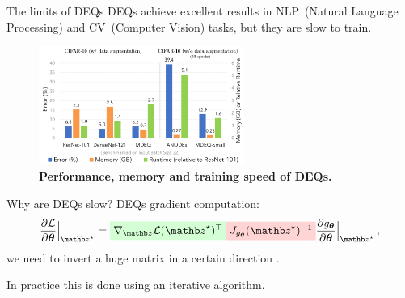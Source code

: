 \begin{frame}{The limits of DEQs}
    DEQs achieve excellent results in NLP~(Natural Language Processing) and CV~(Computer Vision) tasks, but they are slow to train.

    \begin{figure}
        \centering
        \includegraphics[width=0.6\textwidth]{Figures/shine_figures/deq_memory.png}
        \caption{\textbf{Performance, memory and training speed of DEQs.}~\citep{Bai2020MultiscaleModels}}
    \end{figure}
    \let\thefootnote\relax{}
\end{frame}

\begin{frame}{Why are DEQs slow?}
    DEQs gradient computation:
    \begin{equation*}
        \frac{\partial \mathcal{L}}{\partial \thetab}\Bigr|_{\zb^\star} = \highlight{green}{$\nabla_\zb \mathcal{L}(\zb^\star)^\top$} \highlight{red}{$J_{g_{\thetab}}(\zb^\star)^{-1}$} \frac{\partial g_{\thetab}}{\partial \thetab}\Bigr|_{\zb^\star} \, ,
    \end{equation*}
    we need to invert a huge matrix  in a certain direction .
    \pause

    In practice this is done using an iterative algorithm.

    \let\thefootnote\relax{}
\end{frame}

